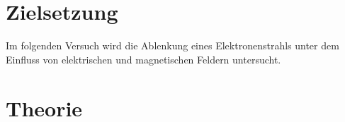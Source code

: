 \section{Zielsetzung}
\label{sec:Zielsetzung}
Im folgenden Versuch wird die Ablenkung eines Elektronenstrahls unter dem Einfluss von
elektrischen und magnetischen Feldern untersucht.

\section{Theorie}
\label{sec:Theorie}

\cite{sample}
